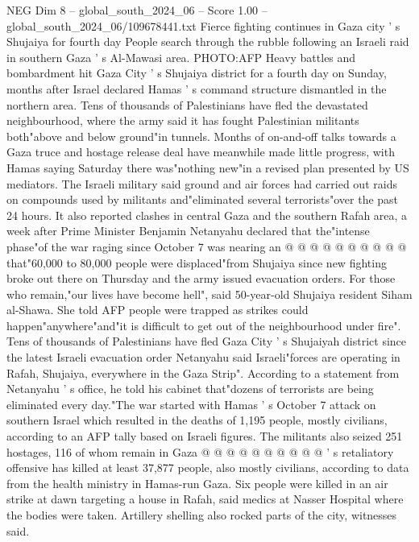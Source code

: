 \begin{textsample}{NEG Dim 8 – global\_south\_2024\_06 – Score 1.00 – global\_south\_2024\_06/109678441.txt}  \label{ex:f8_neg_245}
Fierce fighting continues in Gaza city ' s Shujaiya for fourth day People search through the rubble following an Israeli raid in southern Gaza ' s Al-Mawasi area.
PHOTO:AFP Heavy battles and bombardment hit Gaza City ' s Shujaiya district for a fourth day on Sunday, months after Israel declared Hamas ' s command structure dismantled in the northern area.
Tens of thousands of Palestinians have fled the devastated neighbourhood, where the army said it has fought Palestinian militants both"above and below ground"in tunnels.
Months of on-and-off talks towards a Gaza truce and hostage release deal have meanwhile made little progress, with Hamas saying Saturday there was"nothing new"in a revised plan presented by US mediators.
The Israeli military said ground and air forces had carried out raids on compounds used by militants and"eliminated several terrorists"over the past 24 hours.
It also reported clashes in central Gaza and the southern Rafah area, a week after Prime Minister Benjamin Netanyahu declared that the"intense phase"of the war raging since October 7 was nearing an @ @ @ @ @ @ @ @ @ @ that"60,000 to 80,000 people were displaced"from Shujaiya since new fighting broke out there on Thursday and the army issued evacuation orders.
For those who remain,"our lives have become hell", said 50-year-old Shujaiya resident Siham al-Shawa.
She told AFP people were trapped as strikes could happen"anywhere"and"it is difficult to get out of the neighbourhood under fire".
Tens of thousands of Palestinians have fled Gaza City ' s Shujaiyah district since the latest Israeli evacuation order Netanyahu said Israeli"forces are operating in Rafah, Shujaiya, everywhere in the Gaza Strip".
According to a statement from Netanyahu ' s office, he told his cabinet that"dozens of terrorists are being eliminated every day."The war started with Hamas ' s October 7 attack on southern Israel which resulted in the deaths of 1,195 people, mostly civilians, according to an AFP tally based on Israeli figures.
The militants also seized 251 hostages, 116 of whom remain in Gaza @ @ @ @ @ @ @ @ @ @ ' s retaliatory offensive has killed at least 37,877 people, also mostly civilians, according to data from the health ministry in Hamas-run Gaza.
Six people were killed in an air strike at dawn targeting a house in Rafah, said medics at Nasser Hospital where the bodies were taken.
Artillery shelling also rocked parts of the city, witnesses said.

\end{textsample}
